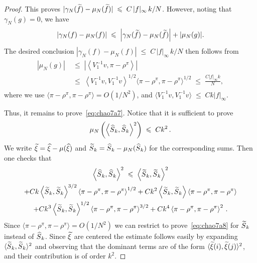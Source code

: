 \documentclass[AHL,Unicode,longabstracts,published]{cedram}
\renewcommand{\leq}{\;\leqslant\;}
\newcommand{\rhoN}{\rho^{\pi}}
\newcommand{\scalar}[2]{\langle #1, #2\rangle}
\let\g=\gamma
\let\oldtilde\tilde
\renewcommand*{\tilde}[1]{\mathchoice{\widetilde{#1}}{\widetilde{#1}}{\oldtilde{#1}}{\oldtilde{#1}}}
\let\oldhat\hat
\renewcommand*{\hat}[1]{\mathchoice{\widehat{#1}}{\widehat{#1}}{\oldhat{#1}}{\oldhat{#1}}}
\begin{document}
\begin{proof}
This proves $|\g_N(\tilde f)-\mu_N(\tilde f)|\leq C \,|f|_\infty\,k/N$. However, noting that $\g_N(g)=0$, we have
\begin{align}\label{eq:chaoa1}
|\g_N(f)-\mu_N(f)|\leq \left|\g_N(\tilde f)-\mu_N(\tilde f)\right|+|\mu_N(g)|.
\end{align}
The desired conclusion $|\g_N(f)-\mu_N(f)|\leq C \,|f|_\infty\,k/N$ then follows from
\begin{align}\label{eq:chaoap1}
\begin{split}
|\mu_N(g)|&\leq \left|\left\langle V_1^{-1}v,\pi-\rhoN\right\rangle\right|\\
&\leq \left\langle V_1^{-1}v,V_1^{-1}v\right\rangle^{1/2}\scalar{\pi-\rhoN}{\pi-\rhoN}^{1/2} \leq \frac{C|f|_\infty k}{N},
\end{split}
\end{align}
where we use $\scalar{\pi-\rhoN}{\pi-\rhoN}=O(1/N^2)$, and $\scalar{V_1^{-1}v}{V_1^{-1}v}\leq Ck|f|_\infty$.

Thus, it remains to prove~\eqref{eq:chao7a7}. Notice that it is sufficient to prove
\begin{align}\label{eq:chao7a8}
\mu_N\left(\left\langle\hat S_k,\hat S_k\right\rangle^2\right)
\leq C k^2\,.
\end{align}
We write $\tilde \xi = \hat \xi - \mu(\hat \xi)$ and $\tilde S_k=\hat S_k - \mu_N(\hat S_k)$ for the corresponding sums. Then one checks that
\begin{multline}\label{eq:chao7a9}
\left\langle\hat S_k,\hat S_k\right\rangle^2
\leq \left\langle\tilde S_k,\tilde S_k\right\rangle^2 \\
+ Ck\left\langle\tilde S_k,\tilde S_k\right\rangle^{3/2}\left\langle\pi-\rhoN,\pi-\rhoN\right\rangle^{1/2}
+ Ck^2\left\langle\tilde S_k,\tilde S_k\right\rangle
\left\langle\pi-\rhoN,\pi-\rhoN\right\rangle \\
+ Ck^3\left\langle\tilde S_k,\tilde S_k\right\rangle^{1/2}\left\langle\pi-\rhoN,\pi-\rhoN\right\rangle^{3/2} + Ck^4\left\langle\pi-\rhoN,\pi-\rhoN\right\rangle^2\,.
\end{multline}
Since $\scalar{\pi-\rhoN}{\pi-\rhoN}=O(1/N^2)$ we can restrict to prove~\eqref{eq:chao7a8} for $\tilde S_k$ instead of $\hat S_k$. Since $\tilde \xi$ are centered the estimate follows easily by expanding $\scalar{\tilde S_k}{\tilde S_k}^2$ and observing that the dominant terms are of the form $\scalar{\tilde\xi(i)}{\tilde\xi(j)}^2$, and their contribution is of order $k^2$.
\end{proof}
\end{document}
